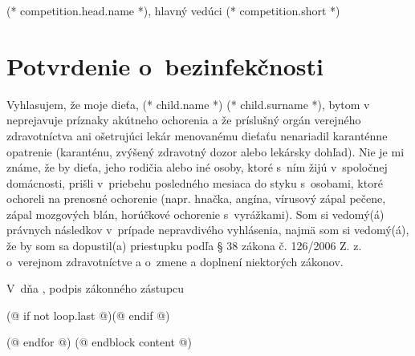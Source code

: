         \hfill (* competition.head.name *), hlavný vedúci (* competition.short *)
    
    \cutHere

    \section{Potvrdenie o~bezinfekčnosti}
        Vyhlasujem, že moje dieťa, (* child.name *) (* child.surname *), bytom v~\makebox[30mm]{\dotfill} neprejavuje príznaky akútneho ochorenia a že
        príslušný orgán verejného zdravotníctva ani ošetrujúci lekár menovanému dieťaťu nenariadil
        karanténne opatrenie (karanténu, zvýšený zdravotný dozor alebo lekársky dohľad). Nie je mi známe, že
        by dieťa, jeho rodičia alebo iné osoby, ktoré s~ním žijú v~spoločnej domácnosti, prišli v~priebehu
        posledného mesiaca do styku s~osobami, ktoré ochoreli na prenosné ochorenie (napr. hnačka, angína,
        vírusový zápal pečene, zápal mozgových blán, horúčkové ochorenie s~vyrážkami). Som si
        vedomý(á) právnych následkov v~prípade nepravdivého vyhlásenia, najmä som si vedomý(á), že by som sa
        dopustil(a) priestupku podľa § 38 zákona č. 126/2006 Z. z. o~verejnom zdravotníctve a o~zmene a
        doplnení niektorých zákonov.
        \vspace{5mm}

        V~\dotfill dňa \dotfill, \hfill podpis zákonného zástupcu \dotfill
        \vspace*{5mm}

    \cutHere
    (@ if not loop.last @)\newpage(@ endif @)

    (@ endfor @)
(@ endblock content @)
